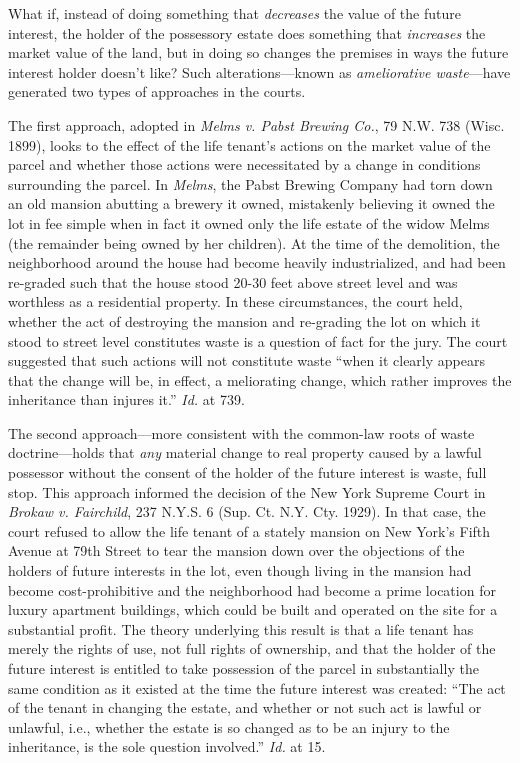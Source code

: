 
What if, instead of doing something that \textit{decreases} the value of the
future interest, the holder of the possessory estate does something that
\textit{increases} the market value of the land, but in doing so changes the
premises in ways the future interest holder doesn't like? Such
alterations---known as \textit{ameliorative waste}---have generated two types
of approaches in the courts.

The first approach, adopted in \textit{Melms v. Pabst Brewing Co.}, 79 N.W. 738
(Wisc. 1899), looks to the effect of the life tenant's actions on the market
value of the parcel and whether those actions were necessitated by a change in
conditions surrounding the parcel. In \textit{Melms}, the Pabst Brewing Company
had torn down an old mansion abutting a brewery it owned, mistakenly believing
it owned the lot in fee simple when in fact it owned only the life estate of
the widow Melms (the remainder being owned by her children). At the time of the
demolition, the neighborhood around the house had become heavily
industrialized, and had been re-graded such that the house stood 20-30 feet
above street level and was worthless as a residential property. In these
circumstances, the court held, whether the act of destroying the mansion and
re-grading the lot on which it stood to street level constitutes waste is a
question of fact for the jury. The court suggested that such actions will not
constitute waste ``when it clearly appears that the change will be, in effect,
a meliorating change, which rather improves the inheritance than injures it.''
\textit{Id.} at 739.

The second approach---more consistent with the common-law roots of waste
doctrine---holds that \textit{any} material change to real property caused by a
lawful possessor without the consent of the holder of the future interest is
waste, full stop. This approach informed the decision of the New York Supreme
Court in \textit{Brokaw v. Fairchild}, 237 N.Y.S. 6 (Sup. Ct. N.Y. Cty. 1929).
In that case, the court refused to allow the life tenant of a stately mansion
on New York's Fifth Avenue at 79th Street to tear the mansion
down over the objections of the holders of future interests in the lot, even
though living in the mansion had become cost-prohibitive and the neighborhood
had become a prime location for luxury apartment buildings, which could be
built and operated on the site for a substantial profit. The theory underlying
this result is that a life tenant has merely the rights of use, not full rights
of ownership, and that the holder of the future interest is entitled to take
possession of the parcel in substantially the same condition as it existed at
the time the future interest was created: ``The act of the tenant in changing
the estate, and whether or not such act is lawful or unlawful, i.e., whether
the estate is so changed as to be an injury to the inheritance, is the sole
question involved.'' \textit{Id.} at 15.

